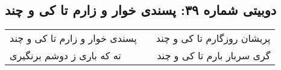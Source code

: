 \begin{center}
\section*{دوبیتی شماره ۳۹: پسندی خوار و زارم تا کی و چند}
\label{sec:039}
\begin{longtable}{l p{0.5cm} r}
پسندی خوار و زارم تا کی و چند
&&
پریشان روزگارم تا کی و چند
\\
ته که باری ز دوشم برنگیری
&&
گری سربار بارم تا کی و چند
\\
\end{longtable}
\end{center}
